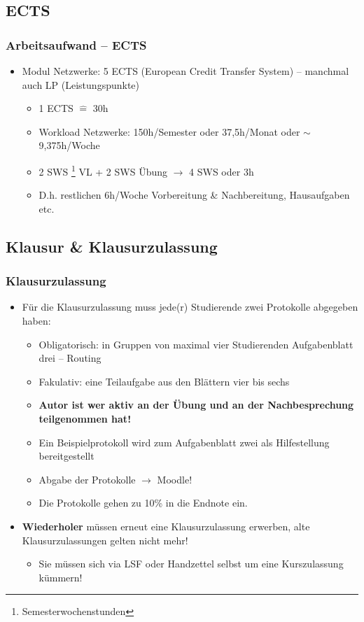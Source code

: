 \documentclass[xcolor=dvipsnames,aspectratio=169]{beamer}
\begin{document}
\subsection{ECTS}
\begin{frame}
	\frametitle{Arbeitsaufwand -- ECTS}
	\begin{itemize}
		\item Modul Netzwerke: 5 ECTS (European Credit Transfer System) -- manchmal auch LP (Leistungspunkte)
			\begin{itemize}
				\item 1 ECTS $\widehat{=}$ 30h
				\item Workload Netzwerke: 150h/Semester oder 37,5h/Monat oder $\sim$ 9,375h/Woche
				\item 2 SWS \footnote{Semesterwochenstunden} VL + 2 SWS Übung $\rightarrow$ 4 SWS oder 3h
				\item D.h. restlichen 6h/Woche Vorbereitung \& Nachbereitung, Hausaufgaben etc.
			\end{itemize}
	\end{itemize}
\end{frame}
\subsection{Klausur \& Klausurzulassung} \label{klausurzulassung}
\begin{frame}
	\frametitle{Klausurzulassung}
	\begin{itemize}
		\item Für die Klausurzulassung muss jede(r) Studierende zwei Protokolle abgegeben haben:
		\begin{itemize}
			\item Obligatorisch: in Gruppen von maximal vier Studierenden Aufgabenblatt drei -- Routing
			\item Fakulativ: eine Teilaufgabe aus den Blättern vier bis sechs
			\item \textbf{Autor ist wer aktiv an der Übung und an der Nachbesprechung teilgenommen hat!}
			\item Ein Beispielprotokoll wird zum Aufgabenblatt zwei als Hilfestellung bereitgestellt
			\item Abgabe der Protokolle $\rightarrow$ Moodle!
			\item Die Protokolle gehen zu 10\% in die Endnote ein.
		\end{itemize}
		\item \textbf{Wiederholer} müssen erneut eine Klausurzulassung erwerben, alte Klausurzulassungen gelten nicht mehr!
		\begin{itemize}
			\item Sie müssen sich via LSF oder Handzettel selbst um eine Kurszulassung kümmern!
		\end{itemize}
	\end{itemize}
\end{frame}
\end{document}
